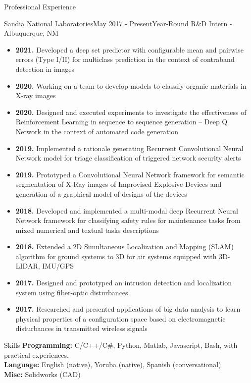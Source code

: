\documentclass{resume} %
\begin{document}
\begin{rSection}{Professional Experience}
\begin{rSubsection}{Sandia National Laboratories}{May 2017 - Present}{Year-Round R\&D Intern - Albuquerque, NM}

\begin{itemize}
    \item \textbf{2021.} Developed a deep set predictor with configurable mean and pairwise errors (Type I/II) for multiclass prediction in the context of contraband detection in images
    \item \textbf{2020.} Working on a team to develop models to classify organic materials in X-ray images
    \item \textbf{2020.} Designed and executed experiments to investigate the effectiveness of Reinforcement Learning in sequence to sequence generation -- Deep Q Network in the context of automated code generation
    \item \textbf{2019.} Implemented a rationale generating Recurrent Convolutional Neural Network model for triage classification of triggered network security alerts
    \item \textbf{2019.} Prototyped a Convolutional Neural Network framework for semantic segmentation of X-Ray images of Improvised Explosive Devices and generation of a graphical model of designs of the devices
    \item \textbf{2018.} Developed and implemented a multi-modal deep Recurrent Neural Network framework for classifying safety rules for maintenance tasks from mixed numerical and textual tasks descriptions
    \item \textbf{2018.} Extended a 2D Simultaneous Localization and Mapping (SLAM) algorithm for ground systems to 3D for air systems equipped with 3D-LIDAR, IMU/GPS
    \item \textbf{2017.} Designed and prototyped an intrusion detection and localization system using fiber-optic disturbances 
    \item \textbf{2017.} Researched and presented applications of big data analysis to learn physical properties of a configuration space based on electromagnetic disturbances in transmitted wireless signals
\end{itemize}

\end{rSubsection}
\end{rSection}

\begin{rSection}{Skills}
\textbf{Programming:} C/C++/C\#, Python, Matlab, Javascript, Bash, with practical experiences.\\
\textbf{Language:} English (native), Yoruba (native), Spanish (conversational)\\
\textbf{Misc:} Solidworks (CAD) 
\end{rSection}
\end{document}

